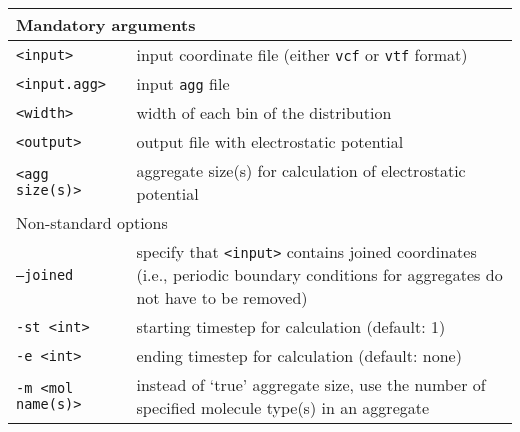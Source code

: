 \noindent
\begin{longtable}{p{}p{}}
  \toprule
  \multicolumn{2}{l}{Mandatory arguments} \\
  \midrule
  \texttt{<input>} & input coordinate file (either \texttt{vcf} or
    \texttt{vtf} format) \\
  \texttt{<input.agg>} & input \texttt{agg} file \\
  \texttt{<width>} & width of each bin of the distribution \\
  \texttt{<output>} & output file with electrostatic potential \\
  \texttt{<agg size(s)>} & aggregate size(s) for calculation of
  electrostatic potential \\
  \toprule
  \multicolumn{2}{l}{Non-standard options} \\
  \midrule
  \texttt{--joined} & specify that \texttt{<input>} contains joined
    coordinates (i.e., periodic boundary conditions for aggregates do not
    have to be removed) \\
  \texttt{-st <int>} & starting timestep for calculation (default: 1) \\
  \texttt{-e <int>} & ending timestep for calculation (default: none) \\
  \texttt{-m <mol name(s)>} & instead of `true' aggregate size, use the number
    of specified molecule type(s) in an aggregate \\
  \bottomrule
\end{longtable}
